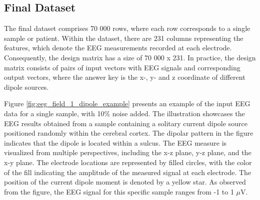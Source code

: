 \documentclass[a4paper, UKenglish, 11pt]{uiomaster}
\begin{document}
\subsection{Final Dataset}
The final dataset comprises 70 000 rows, where each row corresponds to a single sample or patient. Within the dataset, there are 231 columns representing the features, which denote the EEG measurements recorded at each electrode. Consequently, the design matrix has a size of 70 000 x 231. In practice, the design matrix consists of pairs of input vectors with EEG signals and corresponding output vectors, where the answer key is the x-, y- and z coordinate of different dipole sources.

Figure \ref{fig:eeg_field_1_dipole_example} presents an example of the input EEG data for a single sample, with 10$\%$ noise added. The illustration showcases the EEG results obtained from a sample containing a solitary current dipole source positioned randomly within the cerebral cortex. The dipolar pattern in the figure indicates that the dipole is located within a sulcus. The EEG measure is visualized from multiple perspectives, including the x-z plane, y-z plane, and the x-y plane. The electrode locations are represented by filled circles, with the color of the fill indicating the amplitude of the measured signal at each electrode. The position of the current dipole moment is denoted by a yellow star. As observed from the figure, the EEG signal for this specific sample ranges from -1 to 1 $\mu$V.

\end{document}
